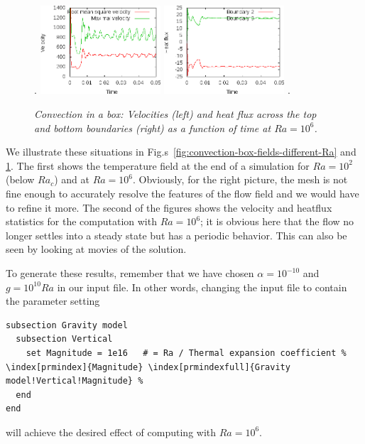 \documentclass{article}
\begin{document}
\begin{figure}
\phantom.
\hfill
\includegraphics[width=0.4\textwidth]{cookbooks/convection-box/ra_1e6_velocity}
\hfill
\includegraphics[width=0.4\textwidth]{cookbooks/convection-box/ra_1e6_heatflux}
\hfill
\phantom.
\caption{\it Convection in a box: Velocities (left) and heat flux across the
top and bottom boundaries (right) as a function of time at $Ra=10^6$.}
\label{fig:convection-box-stats-different-Ra}
\end{figure}

We illustrate these situations in
Fig.s~\ref{fig:convection-box-fields-different-Ra} and
\ref{fig:convection-box-stats-different-Ra}. The first shows the temperature
field at the end of a simulation for $Ra=10^2$ (below $Ra_c$) and at $Ra=10^6$.
Obviously, for the right picture, the mesh is not fine enough to accurately
resolve the features of the flow field and we would have to refine it more. The
second of the figures shows the velocity and heatflux statistics for the
computation with $Ra=10^6$; it is obvious here that the flow no longer settles
into a steady state but has a periodic behavior. This can also be seen by
looking at movies of the solution.

To generate these results, remember that we have chosen $\alpha=10^{-10}$ and
$g=10^{10}Ra$ in our input file. In other words, changing the input file to
contain the parameter setting
\begin{lstlisting}[frame=single,language=prmfile,escapechar=\%]
subsection Gravity model
  subsection Vertical
    set Magnitude = 1e16   # = Ra / Thermal expansion coefficient % \index[prmindex]{Magnitude} \index[prmindexfull]{Gravity model!Vertical!Magnitude} %
  end
end
\end{lstlisting}
will achieve the desired effect of computing with $Ra=10^6$.
\end{document}
